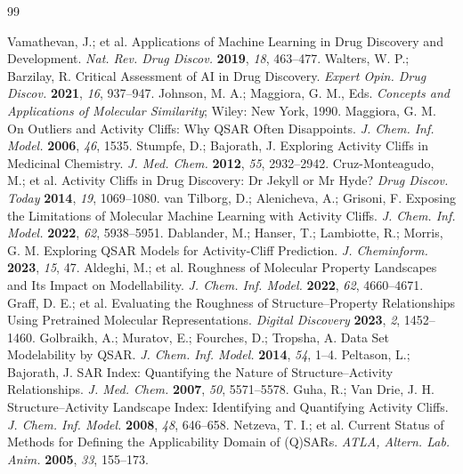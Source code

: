 \documentclass[11pt,letterpaper]{article}
\begin{document}
\begin{thebibliography}{99}

 Vamathevan, J.; et al. Applications of Machine Learning in Drug Discovery and Development. \textit{Nat. Rev. Drug Discov.} \textbf{2019}, \textit{18}, 463--477.
 Walters, W. P.; Barzilay, R. Critical Assessment of AI in Drug Discovery. \textit{Expert Opin. Drug Discov.} \textbf{2021}, \textit{16}, 937--947.
 Johnson, M. A.; Maggiora, G. M., Eds. \textit{Concepts and Applications of Molecular Similarity}; Wiley: New York, 1990.
 Maggiora, G. M. On Outliers and Activity Cliffs: Why QSAR Often Disappoints. \textit{J. Chem. Inf. Model.} \textbf{2006}, \textit{46}, 1535.
 Stumpfe, D.; Bajorath, J. Exploring Activity Cliffs in Medicinal Chemistry. \textit{J. Med. Chem.} \textbf{2012}, \textit{55}, 2932--2942.
 Cruz-Monteagudo, M.; et al. Activity Cliffs in Drug Discovery: Dr Jekyll or Mr Hyde? \textit{Drug Discov. Today} \textbf{2014}, \textit{19}, 1069--1080.
 van Tilborg, D.; Alenicheva, A.; Grisoni, F. Exposing the Limitations of Molecular Machine Learning with Activity Cliffs. \textit{J. Chem. Inf. Model.} \textbf{2022}, \textit{62}, 5938--5951.
 Dablander, M.; Hanser, T.; Lambiotte, R.; Morris, G. M. Exploring QSAR Models for Activity-Cliff Prediction. \textit{J. Cheminform.} \textbf{2023}, \textit{15}, 47.
 Aldeghi, M.; et al. Roughness of Molecular Property Landscapes and Its Impact on Modellability. \textit{J. Chem. Inf. Model.} \textbf{2022}, \textit{62}, 4660--4671.
 Graff, D. E.; et al. Evaluating the Roughness of Structure--Property Relationships Using Pretrained Molecular Representations. \textit{Digital Discovery} \textbf{2023}, \textit{2}, 1452--1460.
 Golbraikh, A.; Muratov, E.; Fourches, D.; Tropsha, A. Data Set Modelability by QSAR. \textit{J. Chem. Inf. Model.} \textbf{2014}, \textit{54}, 1--4.
 Peltason, L.; Bajorath, J. SAR Index: Quantifying the Nature of Structure--Activity Relationships. \textit{J. Med. Chem.} \textbf{2007}, \textit{50}, 5571--5578.
 Guha, R.; Van Drie, J. H. Structure--Activity Landscape Index: Identifying and Quantifying Activity Cliffs. \textit{J. Chem. Inf. Model.} \textbf{2008}, \textit{48}, 646--658.
 Netzeva, T. I.; et al. Current Status of Methods for Defining the Applicability Domain of (Q)SARs. \textit{ATLA, Altern. Lab. Anim.} \textbf{2005}, \textit{33}, 155--173.

\end{thebibliography}
\end{document}
